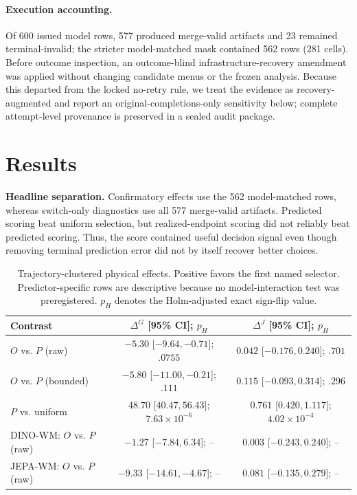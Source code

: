 \documentclass[letterpaper,10pt,conference]{ieeeconf}
\begin{document}
\paragraph{Execution accounting.}
Of 600 issued model rows, 577 produced merge-valid artifacts and 23 remained
terminal-invalid; the stricter model-matched mask contained 562 rows (281
cells). Before outcome inspection, an outcome-blind infrastructure-recovery
amendment was applied without changing candidate menus or the frozen analysis.
Because this departed from the locked no-retry rule, we treat the evidence as
recovery-augmented and report an original-completions-only sensitivity below;
complete attempt-level provenance is preserved in a sealed audit package.

\section{Results}

\noindent\textbf{Headline separation.}
Confirmatory effects use the 562 model-matched rows, whereas switch-only
diagnostics use all 577 merge-valid artifacts. Predicted scoring beat uniform
selection, but realized-endpoint scoring did not reliably beat predicted
scoring. Thus, the score contained useful decision signal even though removing
terminal prediction error did not by itself recover better choices.

\begin{table}[t]
  \caption{Trajectory-clustered physical effects. Positive favors the first
  named selector. Predictor-specific rows are descriptive because no
  model-interaction test was preregistered. $p_H$ denotes the Holm-adjusted
  exact sign-flip value.}
  \label{tab:effects}
  \centering
  \small
  \begin{tabular}{lcc}
    \toprule
    Contrast & $\Delta^G$ [95\% CI]; $p_H$ & $\Delta^J$ [95\% CI]; $p_H$ \\
    \midrule
    $O$ vs. $P$ (raw) & $-5.30$ [$-9.64,-0.71$]; $.0755$ & $0.042$ [$-0.176,0.240$]; $.701$ \\
    $O$ vs. $P$ (bounded) & $-5.80$ [$-11.00,-0.21$]; $.111$ & $0.115$ [$-0.093,0.314$]; $.296$ \\
    $P$ vs. uniform & $48.70$ [$40.47,56.43$]; $7.63\!\times\!10^{-6}$ & $0.761$ [$0.420,1.117$]; $4.02\!\times\!10^{-4}$ \\
    \midrule
    DINO-WM: $O$ vs. $P$ (raw) & $-1.27$ [$-7.84,6.34$]; -- & $0.003$ [$-0.243,0.240$]; -- \\
    JEPA-WM: $O$ vs. $P$ (raw) & $-9.33$ [$-14.61,-4.67$]; -- & $0.081$ [$-0.135,0.279$]; -- \\
    \bottomrule
  \end{tabular}
\end{table}
\end{document}
